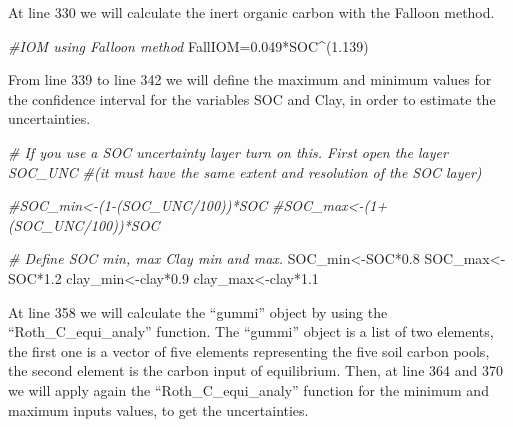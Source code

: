 \documentclass[
  10pt,
  b5paper,
]{book}
\newenvironment{Shaded}{\begin{snugshade}}{\end{snugshade}}
\newcommand{\CommentTok}[1]{\textcolor[rgb]{0.56,0.35,0.01}{\textit{#1}}}
\newcommand{\FloatTok}[1]{\textcolor[rgb]{0.00,0.00,0.81}{#1}}
\newcommand{\NormalTok}[1]{#1}
\newcommand{\OtherTok}[1]{\textcolor[rgb]{0.56,0.35,0.01}{#1}}
\newcommand{\SpecialCharTok}[1]{\textcolor[rgb]{0.00,0.00,0.00}{#1}}
\begin{document}
At line 330 we will calculate the inert organic carbon with the Falloon method.

\begin{Shaded}
\begin{Highlighting}[]
    \CommentTok{\#IOM using Falloon method}
\NormalTok{    FallIOM}\OtherTok{=}\FloatTok{0.049}\SpecialCharTok{*}\NormalTok{SOC}\SpecialCharTok{\^{}}\NormalTok{(}\FloatTok{1.139}\NormalTok{) }
\end{Highlighting}
\end{Shaded}

From line 339 to line 342 we will define the maximum and minimum values for the confidence interval for the variables SOC and Clay, in order to estimate the uncertainties.

\begin{Shaded}
\begin{Highlighting}[]
  \CommentTok{\# If you use a SOC uncertainty layer turn on this. First open the layer SOC\_UNC }
    \CommentTok{\#(it must have the same extent and resolution of the SOC layer)}
    
    \CommentTok{\#SOC\_min\textless{}{-}(1{-}(SOC\_UNC/100))*SOC}
    \CommentTok{\#SOC\_max\textless{}{-}(1+(SOC\_UNC/100))*SOC}
    
    \CommentTok{\# Define SOC min, max Clay min and max. }
\NormalTok{    SOC\_min}\OtherTok{\textless{}{-}}\NormalTok{SOC}\SpecialCharTok{*}\FloatTok{0.8}
\NormalTok{    SOC\_max}\OtherTok{\textless{}{-}}\NormalTok{SOC}\SpecialCharTok{*}\FloatTok{1.2}
\NormalTok{    clay\_min}\OtherTok{\textless{}{-}}\NormalTok{clay}\SpecialCharTok{*}\FloatTok{0.9}
\NormalTok{    clay\_max}\OtherTok{\textless{}{-}}\NormalTok{clay}\SpecialCharTok{*}\FloatTok{1.1}
\end{Highlighting}
\end{Shaded}

At line 358 we will calculate the ``gummi'' object by using the ``Roth\_C\_equi\_analy'' function. The ``gummi'' object is a list of two elements, the first one is a vector of five elements representing the five soil carbon pools, the second element is the carbon input of equilibrium. Then, at line 364 and 370 we will apply again the ``Roth\_C\_equi\_analy'' function for the minimum and maximum inputs values, to get the uncertainties.
\end{document}
